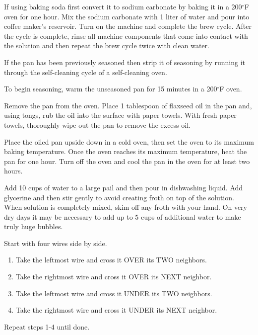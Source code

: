 \documentclass[letterpaper]{recipePMG}
\renewcommand{\deg}{$^\circ$}
\begin{document}


If using baking soda first convert it to sodium carbonate by baking it in a 200\deg F oven for one hour.  Mix the sodium carbonate with 1 liter of water and pour into coffee maker's reservoir. Turn on the machine and complete the brew cycle.  After the cycle is complete, rinse all machine components that come into contact with the solution and then repeat the brew cycle twice with clean water.

\newpage



If the pan has been previously seasoned then strip it of seasoning by running it through the self-cleaning cycle of a self-cleaning oven. 

To begin seasoning, warm the unseasoned pan for 15 minutes in a 200\deg F oven. 

Remove the pan from the oven.  Place 1 tablespoon of flaxseed oil in the pan and, using tongs, rub the oil into the surface with paper towels. With fresh paper towels, thoroughly wipe out the pan to remove the excess oil. 

Place the oiled pan upside down in a cold oven, then set the oven to its maximum baking temperature. Once the oven reaches its maximum temperature, heat the pan for one hour.  Turn off the oven and cool the pan in the oven for at least two hours.



Add 10 cups of water to a large pail and then pour in dishwashing liquid.  Add glycerine and then stir gently to avoid creating froth on top of the solution.  When solution is completely mixed, skim off any froth with your hand. On very dry days it may be necessary to add up to 5 cups of additional water to make truly huge bubbles.



Start with four wires side by side.
\begin{enumerate}
\item Take the leftmost wire and cross it OVER its TWO neighbors. 
\item Take the rightmost wire and cross it OVER its NEXT neighbor.
\item Take the leftmost wire and cross it UNDER its TWO neighbors.
\item Take the rightmost wire and cross it UNDER its NEXT neighbor.
\end{enumerate}
Repeat steps 1-4 until done.
\end{document}
